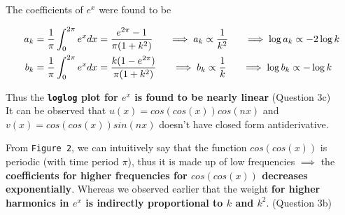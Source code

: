 \documentclass[12pt, a4paper]{report}
\begin{document}
 The coefficients of $e^x$ were found to be

 \begin{align*}
a_{k}&=\frac{1}{\pi}\int_{0}^{2\pi} e^xdx = \frac{e^{2\pi}-1}{\pi(1+k^2)}
\hspace{0.5cm}\implies a_k \propto \frac{1}{k^2} \hspace{0.5cm}\implies \log a_k \propto -2\log k\\
b_{k}&=\frac{1}{\pi}\int_{0}^{2\pi} e^xdx = \frac{k(1-e^{2\pi})}{\pi(1+k^2)} \hspace{0.5cm}\implies b_k \propto \frac{1}{k}\hspace{0.5cm}\implies \log b_k \propto -\log k
 \end{align*}

 Thus the \textbf{\texttt{loglog} plot for $e^x$ is found to be nearly linear} (Question 3c)
\\

It can be observed that $u(x) = cos(cos(x))cos(nx)$ and $v(x) = cos(cos(x))sin(nx)$ doesn't have closed form antiderivative. 

From \texttt{Figure 2}, we can intuitively say that the function $cos(cos(x))$ is periodic (with time period $\pi$), thus it is made up of low frequencies $\implies$ the \textbf{coefficients for higher frequencies for $cos(cos(x))$ decreases exponentially}. Whereas we observed earlier that the weight \textbf{for higher harmonics in $e^x$ is indirectly proportional to $k$ and $k^2$}. (Question 3b) 
\\
\end{document}
